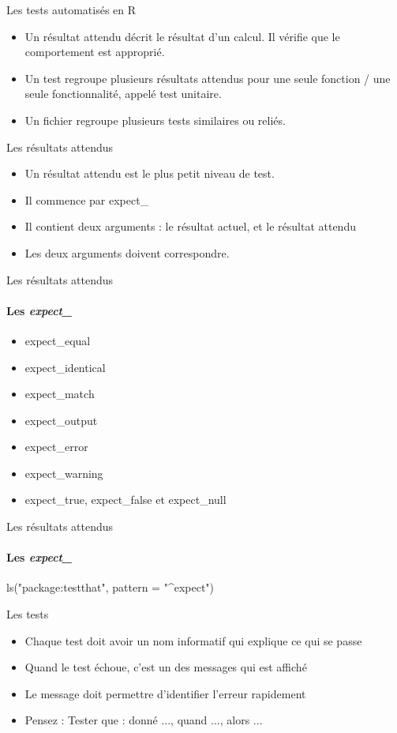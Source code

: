 \documentclass[11pt]{beamer}
\begin{document}
\begin{frame}{Les tests automatisés en R}
\begin{itemize}
\item Un résultat attendu décrit le résultat d'un calcul. Il vérifie que le comportement est approprié. 
\item Un test regroupe plusieurs résultats attendus pour une seule fonction / une seule fonctionnalité, appelé test unitaire. 
\item Un fichier regroupe plusieurs tests similaires ou reliés. 
\end{itemize}
\end{frame}

\begin{frame}{Les résultats attendus}
\begin{itemize}
\item Un résultat attendu est le plus petit niveau de test. 
\item Il commence par expect\_
\item Il contient deux arguments : le résultat actuel, et le résultat attendu
\item Les deux arguments doivent correspondre. 
\end{itemize}
\end{frame}

\begin{frame}{Les résultats attendus}
\framesubtitle{Les \emph{expect\_}}
\begin{itemize}
\item expect\_equal
\item expect\_identical
\item expect\_match
\item expect\_output
\item expect\_error
\item expect\_warning
\item expect\_true, expect\_false et expect\_null
\end{itemize}
\end{frame}


\begin{frame}{Les résultats attendus}
\framesubtitle{Les \emph{expect\_}}
{\ttfamily ls("package:testthat", pattern = "\^{}expect")}
\end{frame}

\begin{frame}{Les tests}
\begin{itemize}
\item Chaque test doit avoir un nom informatif qui explique ce qui se passe
\item Quand le test échoue, c'est un des messages qui est affiché
\item Le message doit permettre d'identifier l'erreur rapidement
\item Pensez : Tester que : donné ..., quand ..., alors ...
\end{itemize}
\end{frame}
\end{document}
